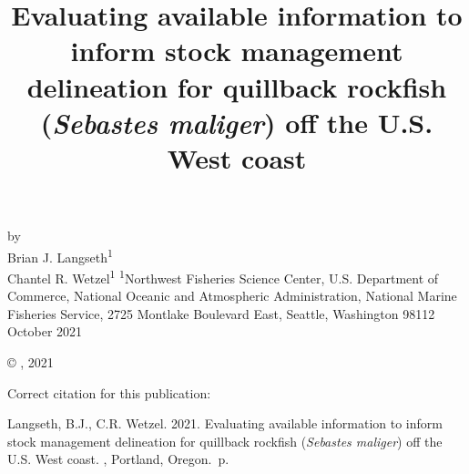 \documentclass[11pt,
  english,
  letterpaper,
]{article}
\date{}
\newcommand{\trTitle}{Evaluating available information to inform stock management delineation for quillback rockfish (\emph{Sebastes maliger}) off the U.S. West coast}
\newcommand{\trYear}{2021}
\newcommand{\trMonth}{October}
\newcommand{\trAuthsBack}{Langseth, B.J., C.R. Wetzel}
\newcommand{\trCitation}{
\begin{hangparas}{1em}{1}
\trAuthsBack{}. \trYear{}. \trTitle{}. \glsentrylong{pfmc}, Portland, Oregon. \pageref{LastPage}{}\,p.
\end{hangparas}}
\begin{document}

\renewcommand*{\thefootnote}{\fnsymbol{footnote}}

\small
\thispagestyle{empty}
\noindent
\begin{center}
\title{Evaluating available information to inform stock management delineation for quillback rockfish (\emph{Sebastes maliger}) off the U.S. West coast}
\vspace{1.5cm}
{\Large\textbf{}}
\vfill
by\\
Brian J. Langseth\textsuperscript{1}\\
Chantel R. Wetzel\textsuperscript{1}\vfill
\textsuperscript{1}Northwest Fisheries Science Center, U.S. Department of Commerce, National Oceanic and Atmospheric Administration, National Marine Fisheries Service, 2725 Montlake Boulevard East, Seattle, Washington 98112\vfill
\trMonth{} \trYear{}
\end{center}
\clearpage

\thispagestyle{empty}
\vspace*{\fill}
\begin{center}
\copyright{} , \trYear{}\\
\end{center}
\par
\bigskip
\noindent
Correct citation for this publication:
\bigskip
\par
\trCitation{}
\clearpage


\tableofcontents\clearpage
\label{TRlastRoman}
\clearpage

\newpage
\thispagestyle{empty} %

\pagestyle{plain}  %
\renewcommand*{\thefootnote}{\arabic{footnote}}  %
\setcounter{footnote}{0}  %
\renewcommand{\headrulewidth}{0.5pt}
\renewcommand{\footrulewidth}{0.5pt}
\end{document}
